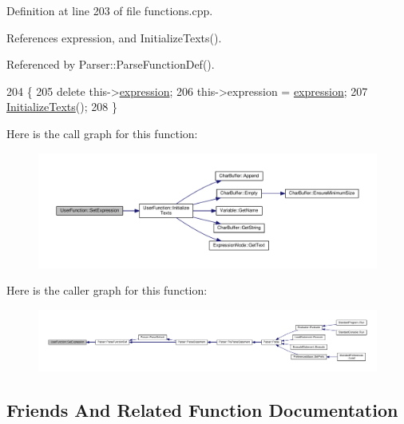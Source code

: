 Definition at line 203 of file functions.\+cpp.



References expression, and Initialize\+Texts().



Referenced by Parser\+::\+Parse\+Function\+Def().


\begin{DoxyCode}
204 \{
205     \textcolor{keyword}{delete} this->\hyperlink{classUserFunction_ab7a0fb4f1265946883ef4e52dbe032f7}{expression};
206     this->expression = \hyperlink{classUserFunction_ab7a0fb4f1265946883ef4e52dbe032f7}{expression};
207     \hyperlink{classUserFunction_a5f22a558f8418f2ef6df952d88c7029b}{InitializeTexts}();
208 \}
\end{DoxyCode}


Here is the call graph for this function\+:
\nopagebreak
\begin{figure}[H]
\begin{center}
\leavevmode
\includegraphics[width=350pt]{de/df8/classUserFunction_ab033663735b65ce885eefd63e6208c24_cgraph}
\end{center}
\end{figure}




Here is the caller graph for this function\+:
\nopagebreak
\begin{figure}[H]
\begin{center}
\leavevmode
\includegraphics[width=350pt]{de/df8/classUserFunction_ab033663735b65ce885eefd63e6208c24_icgraph}
\end{center}
\end{figure}




\subsection{Friends And Related Function Documentation}
